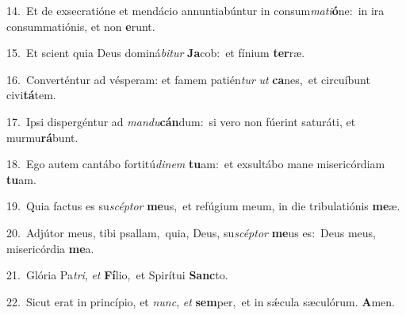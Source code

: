 {\numbfont\textcolor{\numbcolor}{14.}}~Et de exsecratióne et mendácio annuntiabúntur in consum\-\textit{ma}\-\textit{ti}\textbf{ó}ne:~\star in ira consummatiónis, et non \textbf{e}\-runt.\par
{\numbfont\textcolor{\numbcolor}{15.}}~Et scient quia Deus dominá\-\textit{bi}\-\textit{tur} \textbf{Ja}\-cob:~\star et fínium \textbf{ter}\-ræ.\par
{\numbfont\textcolor{\numbcolor}{16.}}~Converténtur ad vésperam: et famem patién\textit{tur} \textit{ut} \textbf{ca}\-nes,~\star et circuíbunt civi\-\textbf{tá}\-tem.\par
{\numbfont\textcolor{\numbcolor}{17.}}~Ipsi dispergéntur ad \textit{man}\-\textit{du}\textbf{cán}dum:~\star si vero non fúerint saturáti, et murmu\-\textbf{rá}\-bunt.\par
{\numbfont\textcolor{\numbcolor}{18.}}~Ego autem cantábo fortitú\-\textit{di}\-\textit{nem} \textbf{tu}\-am:~\star et exsultábo mane misericórdiam \textbf{tu}\-am.\par
{\numbfont\textcolor{\numbcolor}{19.}}~Quia factus es su\-\textit{scép}\-\textit{tor} \textbf{me}\-us,~\star et refúgium meum, in die tribulatiónis \textbf{me}\-æ.\par
{\numbfont\textcolor{\numbcolor}{20.}}~Adjútor meus, tibi psallam,~\dagger quia, Deus, su\-\textit{scép}\-\textit{tor} \textbf{me}\-us es:~\star Deus meus, misericórdia \textbf{me}\-a.\par
{\numbfont\textcolor{\numbcolor}{21.}}~Glória Pa\-\textit{tri}\-, \textit{et} \textbf{Fí}\-lio,~\star et Spirítui \textbf{Sanc}\-to.\par
{\numbfont\textcolor{\numbcolor}{22.}}~Sicut erat in princípio, et \textit{nunc}\-, \textit{et} \textbf{sem}\-per,~\star et in sǽcula sæculórum. \textbf{A}\-men.\par
